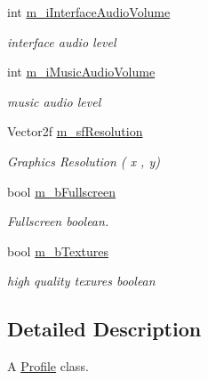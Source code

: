 \begin{DoxyCompactItemize}
\hypertarget{class_profile_a4d785b3d9bd75173abfa6f8b98d72f70}{}\label{class_profile_a4d785b3d9bd75173abfa6f8b98d72f70} 
int \hyperlink{class_profile_a4d785b3d9bd75173abfa6f8b98d72f70}{m\+\_\+i\+Interface\+Audio\+Volume}
\begin{DoxyCompactList}\small\item\em interface audio level \end{DoxyCompactList}\item 
\hypertarget{class_profile_ad539b144e98e879f6759a9082ad8f17c}{}\label{class_profile_ad539b144e98e879f6759a9082ad8f17c} 
int \hyperlink{class_profile_ad539b144e98e879f6759a9082ad8f17c}{m\+\_\+i\+Music\+Audio\+Volume}
\begin{DoxyCompactList}\small\item\em music audio level \end{DoxyCompactList}\item 
\hypertarget{class_profile_a32263f8c1a2c9d2158450774601f77b8}{}\label{class_profile_a32263f8c1a2c9d2158450774601f77b8} 
Vector2f \hyperlink{class_profile_a32263f8c1a2c9d2158450774601f77b8}{m\+\_\+sf\+Resolution}
\begin{DoxyCompactList}\small\item\em Graphics Resolution ( x , y) \end{DoxyCompactList}\item 
\hypertarget{class_profile_a46c194b7ca443a11e74c413b7f4795bd}{}\label{class_profile_a46c194b7ca443a11e74c413b7f4795bd} 
bool \hyperlink{class_profile_a46c194b7ca443a11e74c413b7f4795bd}{m\+\_\+b\+Fullscreen}
\begin{DoxyCompactList}\small\item\em Fullscreen boolean. \end{DoxyCompactList}\item 
\hypertarget{class_profile_abe8d5282ca1966bf2985bf4d79bef78f}{}\label{class_profile_abe8d5282ca1966bf2985bf4d79bef78f} 
bool \hyperlink{class_profile_abe8d5282ca1966bf2985bf4d79bef78f}{m\+\_\+b\+Textures}
\begin{DoxyCompactList}\small\item\em high quality texures boolean \end{DoxyCompactList}\end{DoxyCompactItemize}


\subsection{Detailed Description}
A \hyperlink{class_profile}{Profile} class.

